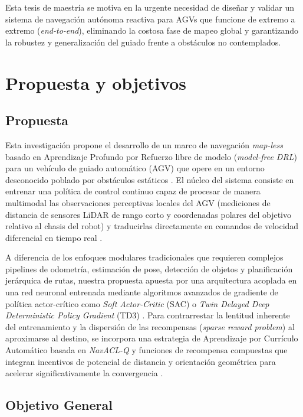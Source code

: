 Esta tesis de maestría se motiva en la urgente necesidad de diseñar y validar un sistema de navegación autónoma reactiva para AGVs que funcione de extremo a extremo (\textit{end-to-end}), eliminando la costosa fase de mapeo global y garantizando la robustez y generalización del guiado frente a obstáculos no contemplados.

\section{Propuesta y objetivos}

\subsection{Propuesta}

Esta investigación propone el desarrollo de un marco de navegación \textit{map-less} basado en Aprendizaje Profundo por Refuerzo libre de modelo (\textit{model-free DRL}) para un vehículo de guiado automático (AGV) que opere en un entorno desconocido poblado por obstáculos estáticos \cite{Sivashangaran2023, Xue2022, Guo2025}. El núcleo del sistema consiste en entrenar una política de control continuo capaz de procesar de manera multimodal las observaciones perceptivas locales del AGV (mediciones de distancia de sensores LiDAR de rango corto y coordenadas polares del objetivo relativo al chasis del robot) y traducirlas directamente en comandos de velocidad diferencial en tiempo real \cite{Xue2022, Guo2025}.

A diferencia de los enfoques modulares tradicionales que requieren complejos pipelines de odometría, estimación de pose, detección de objetos y planificación jerárquica de rutas, nuestra propuesta apuesta por una arquitectura acoplada en una red neuronal entrenada mediante algoritmos avanzados de gradiente de política actor-crítico como \textit{Soft Actor-Critic} (SAC) o \textit{Twin Delayed Deep Deterministic Policy Gradient} (TD3) \cite{Sivashangaran2023, Xue2022, Guo2025}. Para contrarrestar la lentitud inherente del entrenamiento y la dispersión de las recompensas (\textit{sparse reward problem}) al aproximarse al destino, se incorpora una estrategia de Aprendizaje por Currículo Automático basada en \textit{NavACL-Q} y funciones de recompensa compuestas que integran incentivos de potencial de distancia y orientación geométrica para acelerar significativamente la convergencia \cite{Xue2022, Guo2025}.

\subsection{Objetivo General}


